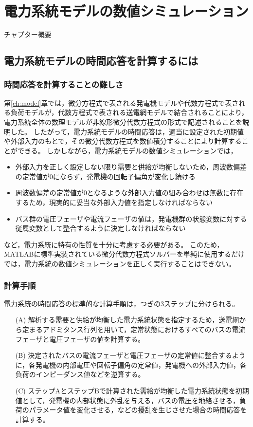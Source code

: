 \documentclass[tombow,dvipdfmx]{corona-a5-1.1}
\begin{document}
\chapter{電力系統モデルの数値シミュレーション}

チャプター概要

\section{電力系統モデルの時間応答を計算するには}\label{sec:howtocal}

\subsection{時間応答を計算することの難しさ}

第\ref{ch:model}章では，微分方程式で表される発電機モデルや代数方程式で表される負荷モデルが，代数方程式で表される送電網モデルで結合されることにより，電力系統全体の数理モデルが非線形微分代数方程式の形式で記述されることを説明した。
したがって，電力系統モデルの時間応答は，適当に設定された初期値や外部入力のもとで，その微分代数方程式を数値積分することにより計算することができる。
しかしながら，電力系統モデルの数値シミュレーションでは，
\begin{itemize}
\item 外部入力を正しく設定しない限り需要と供給が均衡しないため，周波数偏差の定常値が0にならず，発電機の回転子偏角が変化し続ける
\item 周波数偏差の定常値が0となるような外部入力値の組み合わせは無数に存在するため，現実的に妥当な外部入力値を指定しなければならない
\item バス群の電圧フェーザや電流フェーザの値は，発電機群の状態変数に対する従属変数として整合するように決定しなければならない
\end{itemize}
など，電力系統に特有の性質を十分に考慮する必要がある。
このため，MATLABに標準実装されている微分代数方程式ソルバーを単純に使用するだけでは，電力系統の数値シミュレーションを正しく実行することはできない。

\subsection{計算手順}\label{sec:numstep}

電力系統の時間応答の標準的な計算手順は，つぎの3ステップに分けられる。

\begin{itemize}
\item[(A)] 解析する需要と供給が均衡した電力系統状態を指定するため，送電網から定まるアドミタンス行列を用いて，定常状態におけるすべてのバスの電流フェーザと電圧フェーザの値を計算する。
\item[(B)] 決定されたバスの電流フェーザと電圧フェーザの定常値に整合するように，各発電機の内部電圧や回転子偏角の定常値，発電機への外部入力値，各負荷のインピーダンス値などを逆算する。
\item[(C)] ステップAとステップBで計算された需給が均衡した電力系統状態を初期値として，発電機の内部状態に外乱を与える，バスの電圧を地絡させる，負荷のパラメータ値を変化させる，などの擾乱を生じさせた場合の時間応答を計算する。
\end{itemize}
\end{document}
